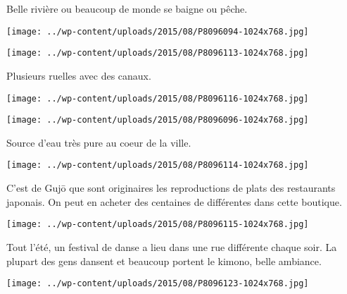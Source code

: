  Belle rivière ou beaucoup de monde se baigne ou pêche. 
\begin{center} \texttt{[image: ../wp-content/uploads/2015/08/P8096094-1024x768.jpg]} \end{center}
\begin{center} \texttt{[image: ../wp-content/uploads/2015/08/P8096113-1024x768.jpg]} \end{center}

 Plusieurs ruelles avec des canaux. 
\begin{center} \texttt{[image: ../wp-content/uploads/2015/08/P8096116-1024x768.jpg]} \end{center}
\begin{center} \texttt{[image: ../wp-content/uploads/2015/08/P8096096-1024x768.jpg]} \end{center}

 Source d'eau très pure au coeur de la ville. 
\begin{center} \texttt{[image: ../wp-content/uploads/2015/08/P8096114-1024x768.jpg]} \end{center}

\pagebreak
 C'est de Gujō que sont originaires les reproductions de plats des restaurants japonais. On peut en acheter des centaines de différentes dans cette boutique. 
\begin{center} \texttt{[image: ../wp-content/uploads/2015/08/P8096115-1024x768.jpg]} \end{center}

 Tout l'été, un festival de danse a lieu dans une rue différente chaque soir. La plupart des gens dansent et beaucoup portent le kimono, belle ambiance. 
\begin{center} \texttt{[image: ../wp-content/uploads/2015/08/P8096123-1024x768.jpg]} \end{center}